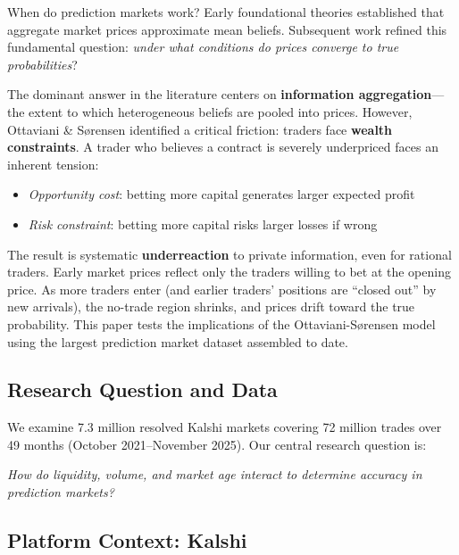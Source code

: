 \documentclass[a4paper,11pt]{article}
\theoremstyle{plain}
\theoremstyle{definition}
\theoremstyle{remark}
\begin{document}
When do prediction markets work? Early foundational theories \citep{Wolfers2004,Wolfers2006} established that aggregate market prices approximate mean beliefs. Subsequent work \citep{Ottaviani2007,Ottaviani2010a,Ottaviani2010b,Page2013} refined this fundamental question: \textit{under what conditions do prices converge to true probabilities}?

The dominant answer in the literature centers on \textbf{information aggregation}---the extent to which heterogeneous beliefs are pooled into prices. However, Ottaviani \& Sørensen identified a critical friction: traders face \textbf{wealth constraints}. A trader who believes a contract is severely underpriced faces an inherent tension:

\begin{itemize}
    \item \textit{Opportunity cost}: betting more capital generates larger expected profit
    \item \textit{Risk constraint}: betting more capital risks larger losses if wrong
\end{itemize}

The result is systematic \textbf{underreaction} to private information, even for rational traders. Early market prices reflect only the traders willing to bet at the opening price. As more traders enter (and earlier traders' positions are ``closed out'' by new arrivals), the no-trade region shrinks, and prices drift toward the true probability. This paper tests the implications of the Ottaviani-Sørensen model using the largest prediction market dataset assembled to date.

\subsection{Research Question and Data}
\label{subsec:rq}

We examine 7.3 million resolved Kalshi markets covering 72 million trades over 49 months (October 2021--November 2025). Our central research question is:

\begin{center}
\emph{How do liquidity, volume, and market age interact to determine accuracy in prediction markets?}
\end{center}

\subsection{Platform Context: Kalshi}
\label{subsec:platform}
\end{document}

